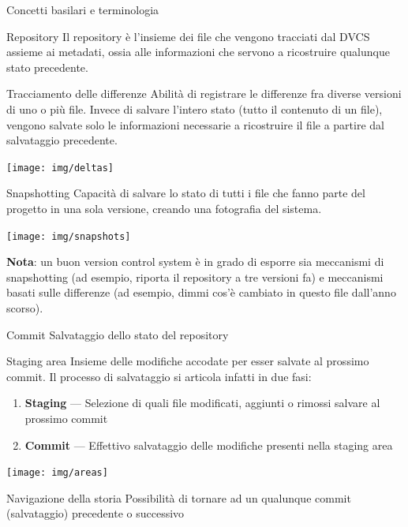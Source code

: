 \documentclass[xcolor=dvipsnames,presentation]{beamer}
\begin{document}
\begin{frame}[allowframebreaks]{Concetti basilari e terminologia}
    \begin{block}{Repository}
        Il repository è l'insieme dei file che vengono tracciati dal DVCS assieme ai metadati, ossia
alle informazioni che servono a ricostruire qualunque stato precedente.
    \end{block}
    \begin{block}{Tracciamento delle differenze}
Abilità di registrare le differenze fra diverse versioni di uno o più file. Invece di
salvare l'intero stato (tutto il contenuto di un file), vengono salvate solo le informazioni
necessarie a ricostruire il file a partire dal salvataggio precedente.
    \end{block}
    \begin{center}
        \texttt{[image: img/deltas]} \\
    \end{center}
    \framebreak
    \begin{block}{Snapshotting}
Capacità di salvare lo stato di tutti i file che fanno parte del progetto in una sola versione, creando una fotografia del sistema.
    \end{block}
    \begin{center}
        \texttt{[image: img/snapshots]} \\
    \end{center}
\textbf{Nota}: un buon version control system è in grado di esporre sia meccanismi di snapshotting (ad esempio, riporta il repository a tre versioni fa)
e meccanismi basati sulle differenze (ad esempio, dimmi cos'è cambiato in questo file dall'anno scorso).
    \framebreak
    \begin{block}{Commit}
        Salvataggio dello stato del repository
    \end{block}
    \begin{block}{Staging area}
        Insieme delle modifiche accodate per esser salvate al prossimo commit. Il processo di
salvataggio si articola infatti in due fasi:
        \begin{enumerate}
            \item \textbf{Staging} --- Selezione di quali file modificati, aggiunti o rimossi
salvare al prossimo commit
            \item \textbf{Commit} --- Effettivo salvataggio delle modifiche presenti nella staging
area
        \end{enumerate}
    \end{block}
    \begin{center}
        \texttt{[image: img/areas]} \\
    \end{center}
    \begin{block}{Navigazione della storia}
        Possibilità di tornare ad un qualunque commit (salvataggio) precedente o successivo
    \end{block}
\end{frame}
\end{document}
